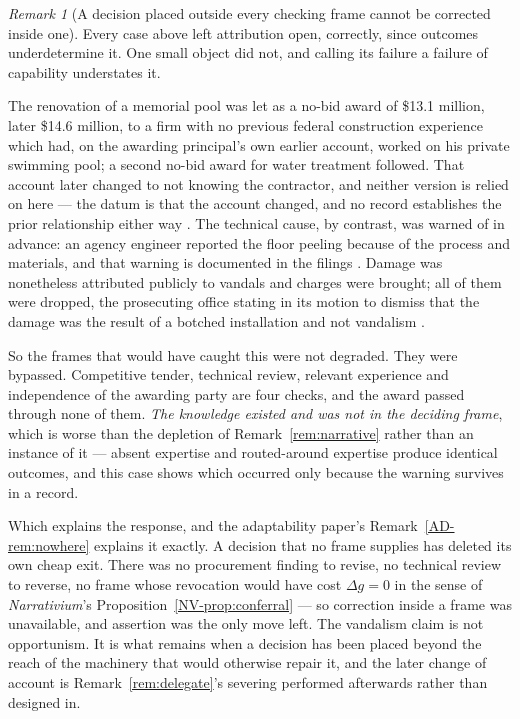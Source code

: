 \documentclass[11pt,a4paper]{article}
\theoremstyle{remark}
\newtheorem{remark}[definition]{Remark}
\begin{document}
\begin{remark}[A decision placed outside every checking frame cannot be corrected inside one]\label{rem:pool}
Every case above left attribution open, correctly, since outcomes underdetermine it. One small
object did not, and calling its failure a failure of capability understates it.

The renovation of a memorial pool was let as a no-bid award of \$13.1 million, later \$14.6 million, to a
firm with no previous federal construction experience which had, on the awarding principal's own earlier
account, worked on his private swimming pool; a second no-bid award for water treatment followed. That
account later changed to not knowing the contractor, and neither version is relied on here --- the
datum is that the account changed, and no record establishes the prior relationship either way
\citep{pool2026}. The technical cause, by contrast, was warned of in advance: an agency engineer
reported the floor peeling because of the process and materials, and that warning is documented in the
filings \citep{poolfilings2026,pbs2026}. Damage was nonetheless attributed publicly to vandals and charges were
brought; all of them were dropped, the prosecuting office stating in its motion to dismiss that the
damage was the result of a botched installation and not vandalism \citep{pooldrop2026}.

So the frames that would have caught this were not degraded. They were bypassed. Competitive
tender, technical review, relevant experience and independence of the awarding party are four checks, and
the award passed through none of them. \emph{The knowledge existed and was not in the deciding frame},
which is worse than the depletion of Remark~\ref{rem:narrative} rather than an instance of it --- absent
expertise and routed-around expertise produce identical outcomes, and this case shows which occurred only
because the warning survives in a record.

Which explains the response, and the adaptability paper's Remark~\ref{AD-rem:nowhere} explains it exactly. A decision that no
frame supplies has deleted its own cheap exit. There was no procurement finding to revise, no technical
review to reverse, no frame whose revocation would have cost $\Delta g=0$ in the sense of
\emph{Narrativium}'s Proposition~\ref{NV-prop:conferral} --- so correction inside
a frame was unavailable, and assertion was the only move left. The vandalism claim is not opportunism.
It is what remains when a decision has been placed beyond the reach of the machinery that would
otherwise repair it, and the later change of account is Remark~\ref{rem:delegate}'s severing performed
afterwards rather than designed in.


\end{remark}
\end{document}
